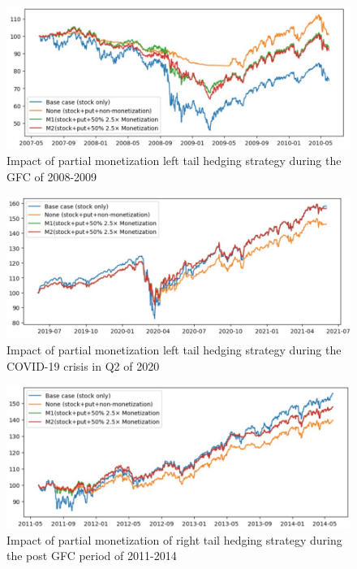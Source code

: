 \documentclass[12pt]{article}
\begin{document}
{{\begin{figure}[htp]
    \centering
    \includegraphics[width=14cm]{left_tail_event1.jpg}
    \caption{Impact of partial monetization left tail hedging strategy during the GFC of 2008-2009}
    \label{fig:galaxy}
\end{figure}

\begin{figure}[htp]
    \centering
    \includegraphics[width=14cm]{left_tail_event2.jpg}
    \caption{Impact of partial monetization left tail hedging strategy during the COVID-19 crisis in Q2 of 2020}
    \label{fig:galaxy}
\end{figure}

\begin{figure}[htp]
    \centering
    \includegraphics[width=14cm]{right_tail_event1.jpg}
    \caption{Impact of partial monetization of right tail hedging strategy during the post GFC period of 2011-2014}
    \label{fig:galaxy}
\end{figure}

}}
\end{document}
